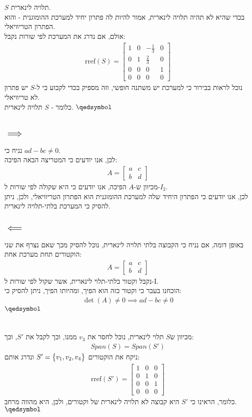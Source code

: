 \documentclass[a4paper, 12pt, leqno]{article}
\newcommand{\sub}[1]{\subsection{\underline{#1}}}
\newcommand{\eq}[1]{\begin{align*}#1\end{align*}}
\newcommand{\set}[1]{\big{\{} #1 \big{\}}}
\renewcommand{\qed}{\hfill\(\qedsymbol\)}
\begin{document}
\pagebreak
\setcounter{section}{13}
\section{}
$S$ תלויה לינארית.\\
בכדי שהיא לא תהיה תלויה לינארית, אמור להיות לה פתרון יחיד למערכת ההומוגנית - והוא הפתרון הטריוויאלי.\\
אולם, אם נדרג את המערכת לפי שורות נקבל:
\eq{
    \text{rref}(S)=\begin{bmatrix}
        1 & 0 & -\frac{1}{3} & 0\\
        0 & 1 & \frac{2}{3} & 0 \\
        0 & 0 & 0 & 1 \\
        0 & 0 & 0 & 0 
    \end{bmatrix}
}
נוכל לראות בבירור כי למערכת יש משתנה חופשי, וזה מספיק בכדי לקבוע כי ל-$S$ יש פתרון לא טריוויאלי.\\
כלומר - $S$ תלויה לינארית.
\qed

\setcounter{section}{19}
\section{}
\sub{$\implies$}
נניח כי $ad-bc\neq0$.\\
לכן, אנו יודעים כי המטריצה הבאה הפיכה:
\eq{
    A=
    \begin{bmatrix}
        a & c\\ b & d
    \end{bmatrix}
}
מכיוון ש-$A$ הפיכה, אנו יודעים כי היא שקולה לפי שורות ל-$I_2$.\\
לכן, אנו יודעים כי הפתרון היחיד שלה למערכת ההומוגנית הוא הפתרון הטריוויאלי, ולכן,
ניתן להסיק כי המערכת בלתי-תלויה לינארית.
\sub{$\impliedby$}
באופן דומה, אם נניח כי הקבוצה בלתי תלויה לינארית, נוכל להסיק מכך שאם נצרף את שני הוקטורים תחת מערכת אחת:
\eq{
    A=
    \begin{bmatrix}
        a & c\\ b & d
    \end{bmatrix}
}
נקבל וקטור בלתי-תלוי לינארית, אשר שקול לפי שורות ל-I.\\
הוכחנו בעבר כי וקטור כזה הוא הפיך, ומהיותו הפיך, ניתן להסיק כי:
\eq{
    \det(A)\neq{0}\implies ad-bc\neq0
}
\qed

\pagebreak
\setcounter{section}{21}
\section{}
מכיוון ש$S$ תלוי לינארית, נוכל לחסר את $v_3$ ממנו, וכך לקבל את $S'$, וכך:
\eq{
    Span(S)=Span(S')
}
ניקח את הוקטורים $S'=\set{v_1,v_2,v_4}$ ונדרג אותם:
\eq{
    \text{rref}(S')=
    \begin{bmatrix}
        1 & 0 & 0\\
        0 & 1 & 0\\
        0 & 0 & 1\\
        0 & 0 & 0
    \end{bmatrix}
}
כלומר, הראינו כי $S'$ היא קבוצה לא תלויה לינארית של וקטורים, ולכן, היא מהווה מרחב.
\qed
\end{document}
